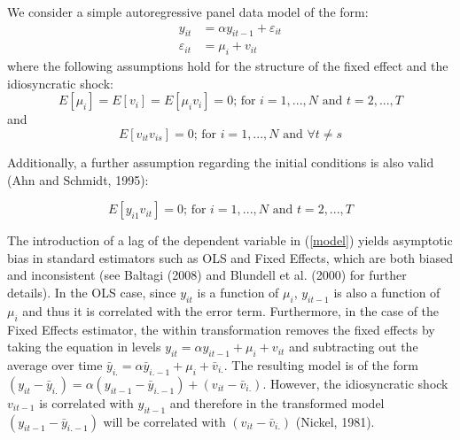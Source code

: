 \documentclass[12pt,a4paper,english]{article}%
\begin{document}
We consider a simple autoregressive panel data model of the form:
\begin{equation}
\label{modelar}
\tag{1'}
\begin{aligned}
y_{it}&=\alpha y_{it-1} + \varepsilon_{it}\\
\varepsilon_{it}&=\mu _{i}+v_{it}
\end{aligned}
\end{equation}
where the following assumptions hold for the structure of the fixed effect and the idiosyncratic shock:
\begin{equation}
\label{as1}
\tag{2'}
E\left[\mu_{i}\right]=E\left[v_{i}\right]=E\left[\mu_{i}v_i\right]=0\text{; for $i=1,...,N$ and $t=2,...,T$}
\end{equation}
and
\begin{equation}
\label{as2}
\tag{3'}
E\left[v_{it}v_{is}\right]=0\text{; for $i=1,...,N$ and $\forall t\neq s$}
\end{equation}

Additionally, a further assumption regarding the initial conditions is also valid (Ahn and Schmidt, 1995):

\begin{equation}
\label{as3}
\tag{4'}
E\left[y_{i1}v_{it}\right]=0\text{; for $i=1,...,N$ and $t=2,...,T$}
\end{equation}

The introduction of a lag of the dependent variable in (\ref{model}) yields asymptotic bias in standard estimators such as OLS and Fixed Effects, which are both biased and inconsistent (see Baltagi (2008) and Blundell et al. (2000) for further details). In the OLS case, since $y_{it}$ is a function of $\mu_{i}$, $y_{it-1}$ is also a function of $\mu_{i}$ and thus it is correlated with the error term. Furthermore, in the case of the Fixed Effects estimator, the within transformation removes the fixed effects by taking the equation in levels $y_{it}=\alpha y_{it-1} + \mu_i+v_{it}$ and subtracting out the average over time $\bar y_{i.}=\alpha \bar y_{i.-1} +\mu_i +\bar v_{i.}$. The resulting model is of the form $(y_{it}-\bar y_{i.})=\alpha (y_{it-1}-\bar y_{i.-1})+ (v_{it}-\bar v_{i.})$. However, the idiosyncratic shock $v_{it-1}$ is correlated with $y_{it-1}$ and therefore in the transformed model $(y_{it-1}-\bar y_{i.-1})$ will be correlated with $(v_{it}-\bar v_{i.})$ (Nickel, 1981).
\end{document}
